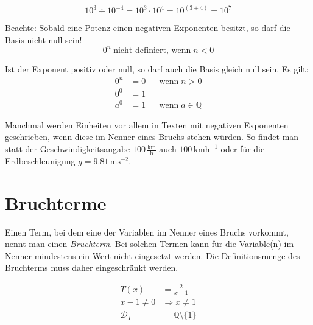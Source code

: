 \begin{bsp}
 \begin{equation*}
  10^3 \div 10^{-4} = 10^3 \cdot 10^4 = 10^{(3+4)} = 10^7
 \end{equation*}
\end{bsp}

\begin{beme}
 Beachte: Sobald eine Potenz einen negativen Exponenten besitzt, so darf die Basis nicht null sein!
 \begin{equation*}
  0^{n} \;\text{nicht definiert, wenn}\; n<0
 \end{equation*}

 Ist der Exponent positiv oder null, so darf auch die Basis gleich null sein. Es gilt:
 \begin{align*}
  0^n &= 0 &&\text{wenn}\;n>0\\
  0^0 &= 1 \\
  a^0 &= 1 &&\text{wenn}\;a\in\mathbb{Q}
 \end{align*}

\end{beme}

\begin{beme}[Einheiten]
 Manchmal werden Einheiten vor allem in Texten mit negativen Exponenten geschrieben, wenn diese im Nenner eines Bruchs stehen würden. So findet man statt der Geschwindigkeitsangabe \(100\,\frac{\text{km}}{\text{h}}\) auch \(100\,\text{km}\text{h}^{-1}\) oder für die Erdbeschleunigung \(g=9.81\,\text{m}\text{s}^{-2}\).
\end{beme}

\section{Bruchterme}
\label{sec:bruchterme}

\begin{defi}[Bruchterm]
 Einen Term, bei dem eine der Variablen im Nenner eines Bruchs vorkommt, nennt man einen \emph{Bruchterm}. Bei solchen Termen kann für die Variable(n) im Nenner mindestens ein Wert nicht eingesetzt werden. Die Definitionsmenge des Bruchterms muss daher eingeschränkt werden.
\end{defi}

\begin{bsp}
 \begin{align*}T(x)&=\frac{2}{x-1} \\ x-1\ne0 &\Rightarrow x\ne 1 \\ \mathcal{D}_T &= \mathbb{Q}\setminus\lbrace 1 \rbrace  
 \end{align*}

\end{bsp}

